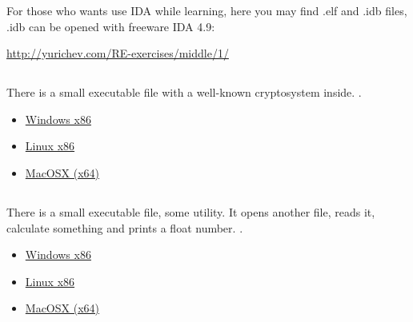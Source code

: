 {For those who wants use IDA while learning, here you may find .elf and .idb files,
.idb can be opened with freeware IDA 4.9:}

\url{http://yurichev.com/RE-exercises/middle/1/}



\subsection{}

{There is a small executable file with a well-known cryptosystem inside}.
.

\begin{itemize}
\item
\href{http://yurichev.com/RE-exercises/middle/2/unknown_cryptosystem.exe}{Windows x86}

\item
\href{http://yurichev.com/RE-exercises/middle/2/unknown_encryption_linux86.tar}{Linux x86}

\item
\href{http://yurichev.com/RE-exercises/middle/2/unknown_encryption_MacOSX.tar}{MacOSX (x64)}
\end{itemize}

\subsection{}

{There is a small executable file, some utility}.
{It opens another file, reads it, calculate something and prints a float number}.
.

\begin{itemize}
\item
\href{http://yurichev.com/RE-exercises/middle/3/unknown_utility_2_3.exe}{Windows x86}

\item
\href{http://yurichev.com/RE-exercises/middle/3/unknown_utility_2_3_Linux86.tar}{Linux x86}

\item
\href{http://yurichev.com/RE-exercises/middle/3/unknown_utility_2_3_MacOSX.tar}{MacOSX (x64)}
\end{itemize}

